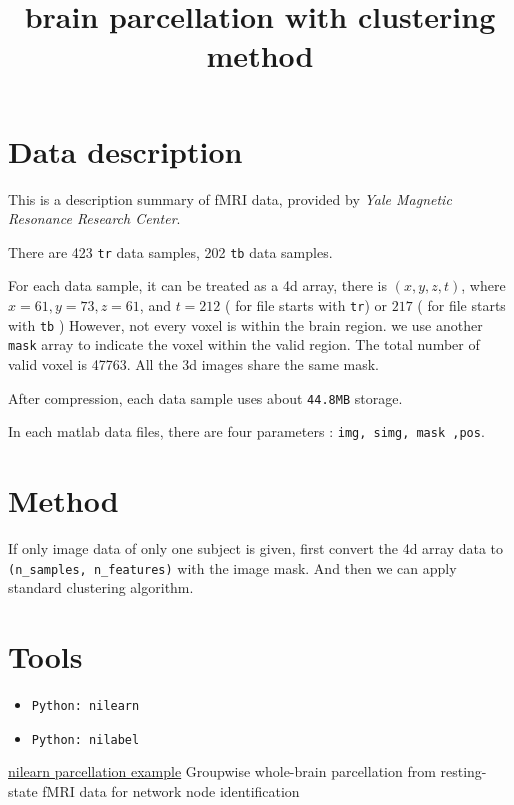 \documentclass{article}
\title{brain parcellation with clustering method}
\def\code#1{\texttt{#1}}
\begin{document}
\maketitle

\section{Data description}
This is a description summary of fMRI data, provided by \textit{Yale 
Magnetic Resonance Research Center}.

There are 423 \code{tr} data samples, 202 \code{tb} data samples.

For each data sample, it can be treated as a 4d array,
there is
$(x, y, z, t)$, where $x = 61, y= 73, z = 61$, and  $t= 212$ ( for
 file starts with \texttt{tr}) or $217$ ( for file starts with \texttt{tb}
)
However, not every voxel is within the brain region. we use another \code{mask} array to indicate the
voxel within the valid region. The total number of valid voxel is 47763.
All the 3d images share the same mask.

After compression, each data sample uses about \code{44.8MB} storage.

In each matlab data files, there are four parameters : \code{img, simg, mask ,pos}.
\section{Method}
If only image data of only one subject is given, first convert the 4d array data to \code{(n\_samples, n\_features)}
with the image mask. And then we can apply standard clustering algorithm.
\section{Tools}
\begin{itemize}
\item \texttt{Python: nilearn}
\item \texttt{Python: nilabel}
\end{itemize}

\begin{thebibliography}{9}
 \href{https://nilearn.github.io/connectivity/parcellating.html}{nilearn parcellation example}
 Groupwise whole-brain parcellation from resting-state fMRI
data for network node identification
\end{thebibliography}
\end{document}
